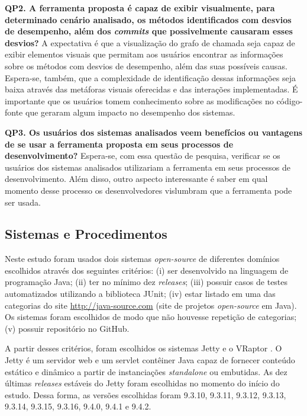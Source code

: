 \textbf{QP2. A ferramenta proposta é capaz de exibir visualmente, para determinado cenário analisado, os métodos identificados com desvios de desempenho, além dos \textit{commits} que possivelmente causaram esses desvios?} A expectativa é que a visualização do grafo de chamada seja capaz de exibir elementos visuais que permitam aos usuários encontrar as informações sobre os métodos com desvios de desempenho, além das suas possíveis causas. Espera-se, também, que a complexidade de identificação dessas informações seja baixa através das metáforas visuais oferecidas e das interações implementadas. É importante que os usuários tomem conhecimento sobre as modificações no código-fonte que geraram algum impacto no desempenho dos sistemas.

\textbf{QP3. Os usuários dos sistemas analisados veem benefícios ou vantagens de se usar a ferramenta proposta em seus processos de desenvolvimento?} Espera-se, com essa questão de pesquisa, verificar se os usuários dos sistemas analisados utilizariam a ferramenta em seus processos de desenvolvimento. Além disso, outro aspecto interessante é saber em qual momento desse processo os desenvolvedores vislumbram que a ferramenta pode ser usada.

\subsection{Sistemas e Procedimentos} \label{subsec:avaliacao-sistemas-procedimentos}

Neste estudo foram usados dois sistemas \textit{open-source} de diferentes domínios escolhidos através dos seguintes critérios: (i) ser desenvolvido na linguagem de programação Java; (ii) ter no mínimo dez \textit{releases}; (iii) possuir casos de testes automatizados utilizando a biblioteca JUnit; (iv) estar listado em uma das categorias do site \href{http://java-source.com}{http://java-source.com} (site de projetos \textit{open-source} em Java). Os sistemas foram escolhidos de modo que não houvesse repetição de categorias; (v) possuir repositório no GitHub.

A partir desses critérios, foram escolhidos os sistemas Jetty \cite{Jetty2016} e o VRaptor \cite{VRaptor2017}. O Jetty é um servidor web e um servlet contêiner Java capaz de fornecer conteúdo estático e dinâmico a partir de instanciações \textit{standalone} ou embutidas. As dez últimas \textit{releases} estáveis do Jetty foram escolhidas no momento do início do estudo. Dessa forma, as versões escolhidas foram 9.3.10, 9.3.11, 9.3.12, 9.3.13, 9.3.14, 9.3.15, 9.3.16, 9.4.0, 9.4.1 e 9.4.2.

